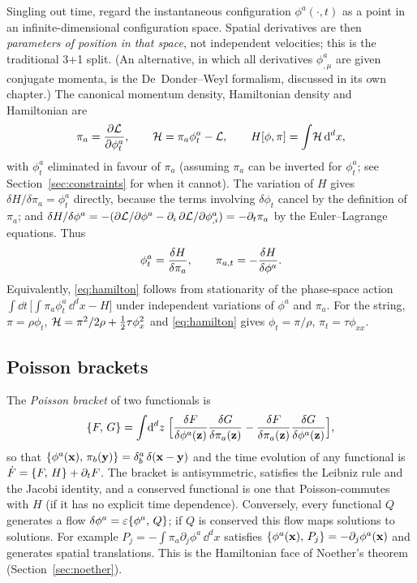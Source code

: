 Singling out time, regard the instantaneous configuration
$\phi^a(\cdot,t)$ as a point in an infinite-dimensional configuration space. Spatial
derivatives are then \emph{parameters of position in that space}, not independent
velocities; this is the traditional 3+1 split. (An alternative, in which all
derivatives $\phi^a_{,\mu}$ are given conjugate momenta, is the
De~Donder--Weyl formalism, discussed in its own chapter.) The canonical momentum
density, Hamiltonian density and Hamiltonian are
\begin{equation}
  \pi_a=\frac{\partial \mathcal{L}}{\partial \phi^a_t},\qquad
  \mathcal{H}=\pi_a\phi^a_t-\mathcal{L},\qquad
  H[\phi,\pi]=\int\!\mathcal{H}\,\mathrm{d}^dx ,
\end{equation}
with $\phi^a_t$ eliminated in favour of $\pi_a$ (assuming $\pi_a$ can be
inverted for $\phi^a_t$; see Section~\ref{sec:constraints} for when it cannot).
The variation of $H$ gives
$\delta H/\delta\pi_a=\phi^a_t$ directly, because the terms involving
$\delta\phi_t$ cancel by the definition of $\pi_a$; and
$\delta H/\delta\phi^a=-(\partial\mathcal{L}/\partial\phi^a-\partial_i\,\partial\mathcal{L}/\partial\phi^a_{,i})=-\partial_t\pi_a$
by the Euler--Lagrange equations. Thus
\begin{equation}
  \phi^a_t=\frac{\delta H}{\delta \pi_a},\qquad \pi_{a,t}=-\frac{\delta H}{\delta \phi^a}.
  \label{eq:hamilton}
\end{equation}
Equivalently, \eqref{eq:hamilton} follows from stationarity of the phase-space
action $\int\dd t\,\big[\int\pi_a\phi^a_t\,\dd^dx-H\big]$ under independent
variations of $\phi^a$ and $\pi_a$. For the string, $\pi=\rho\phi_t$,
$\mathcal{H}=\pi^2/2\rho+\tfrac12\tau\phi_x^2$ and \eqref{eq:hamilton} gives
$\phi_t=\pi/\rho$, $\pi_t=\tau\phi_{xx}$.

\subsection{Poisson brackets}
\label{sec:poisson}

The \emph{Poisson bracket} of two functionals is
\begin{equation}
  \{F,\,G\}=\int\!\mathrm{d}^dz\;\Big[\frac{\delta F}{\delta \phi^a(\mathbf{z})}\frac{\delta G}{\delta \pi_a(\mathbf{z})}
  -\frac{\delta F}{\delta \pi_a(\mathbf{z})}\frac{\delta G}{\delta \phi^a(\mathbf{z})}\Big],
  \label{eq:PB}
\end{equation}
so that $\{\phi^a(\mathbf{x}),\,\pi_b(\mathbf{y})\}=\delta^a_b\,\delta(\mathbf{x}-\mathbf{y})$
and the time evolution of any functional is $\dot F=\{F,\,H\}+\partial_tF$. The
bracket is antisymmetric, satisfies the Leibniz rule and the Jacobi identity,
and a conserved functional is one that Poisson-commutes with $H$ (if it has
no explicit time dependence). Conversely, every functional $Q$ generates a flow
$\delta\phi^a=\varepsilon\{\phi^a,\,Q\}$; if $Q$ is conserved this flow maps solutions
to solutions. For example $P_j=-\int\pi_a\partial_j\phi^a\,\dd^dx$ satisfies
$\{\phi^a(\mathbf{x}),\,P_j\}=-\partial_j\phi^a(\mathbf{x})$ and generates
spatial translations. This is the Hamiltonian face of Noether's theorem
(Section~\ref{sec:noether}).

